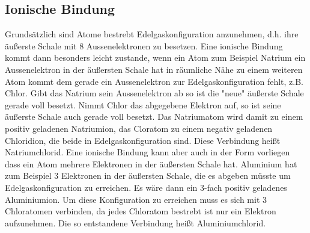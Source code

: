 	\subsection{Ionische Bindung}
	Grundsätzlich sind Atome bestrebt Edelgaskonfiguration anzunehmen, d.h. ihre äußerste Schale mit 8 Aussenelektronen zu besetzen. Eine ionische Bindung kommt dann besonders leicht zustande, wenn ein Atom zum Beispiel Natrium ein Aussenelektron in der äußersten Schale hat in räumliche Nähe zu einem weiteren Atom kommt dem gerade ein Aussenelektron zur Edelgaskonfiguration fehlt, z.B. Chlor. Gibt das Natrium sein Aussenelektron ab so ist die "neue" äußerste Schale gerade voll besetzt. Nimmt Chlor das abgegebene Elektron auf, so ist seine äußerste Schale auch gerade voll besetzt. Das Natriumatom wird damit zu einem positiv geladenen Natriumion, das Cloratom zu einem negativ geladenen Chloridion, die beide in Edelgaskonfiguration sind. Diese Verbindung heißt Natriumchlorid. Eine ionische Bindung kann aber auch in der Form vorliegen dass ein Atom mehrere Elektronen in der äußersten Schale hat. Aluminium hat zum Beispiel 3 Elektronen in der äußersten Schale, die es abgeben müsste um Edelgaskonfiguration zu erreichen. Es wäre dann ein 3-fach positiv geladenes Aluminiumion. Um diese Konfiguration zu erreichen muss es sich mit 3 Chloratomen verbinden, da jedes Chloratom bestrebt ist nur ein Elektron aufzunehmen. Die so entstandene Verbindung heißt Aluminiumchlorid.
